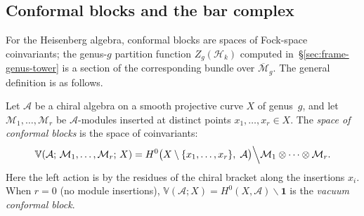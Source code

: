 \subsection{Conformal blocks and the bar complex}
\label{sec:conformal-blocks}

For the Heisenberg algebra, conformal blocks are spaces of Fock-space
coinvariants; the genus-$g$ partition function $Z_g(\mathcal{H}_k)$
computed in~\S\ref{sec:frame-genus-tower} is a section of the
corresponding bundle over $\overline{\mathcal{M}}_g$. The general
definition is as follows.

\begin{definition}
\label{def:conformal-blocks}
Let $\mathcal{A}$ be a chiral algebra on a smooth projective
curve $X$ of genus~$g$, and let
$\mathcal{M}_1, \ldots, \mathcal{M}_r$ be $\mathcal{A}$-modules
inserted at distinct points $x_1, \ldots, x_r \in X$. The
\emph{space of conformal blocks} is the space of coinvariants:
\begin{equation}\label{eq:conformal-blocks}
\mathbb{V}(\mathcal{A};\, \mathcal{M}_1, \ldots, \mathcal{M}_r;\, X)
= H^0\bigl(
 X \setminus \{x_1, \ldots, x_r\},\;
 \mathcal{A} \bigr) \Big\backslash
 \mathcal{M}_1 \otimes \cdots \otimes \mathcal{M}_r.
\end{equation}
Here the left action is by the residues of the chiral bracket
along the insertions $x_i$. When $r = 0$ (no module insertions),
$\mathbb{V}(\mathcal{A}; X) = H^0(X, \mathcal{A}) \backslash
\mathbf{1}$ is the \emph{vacuum conformal block}.
\end{definition}

